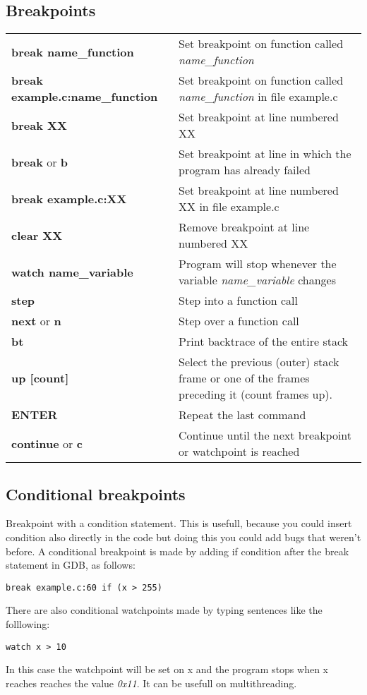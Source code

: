 \subsection{Breakpoints}
\begin{table}[h]
\footnotesize\centering
\begin{tabular}{|l|l|}
\hline
{\textbf{break name\_function}} & {Set breakpoint on function called \textit{name\_function}}\\
{\textbf{break example.c:name\_function}} & {Set breakpoint on function called \textit{name\_function} in file example.c}\\
\hline
{\textbf{break XX}} & {Set breakpoint at line numbered XX}\\
{\textbf{break} or \textbf{b}} & {Set breakpoint at line in which the program has already failed}\\
{\textbf{break example.c:XX}} & {Set breakpoint at line numbered XX in file example.c}\\
\hline
{\textbf{clear XX}} & {Remove breakpoint at line numbered XX}\\
\hline
{\textbf{watch name\_variable}} & {Program will stop whenever the variable \textit{name\_variable} changes}\\
\hline
{\textbf{step}} & {Step into a function call}\\
\hline
{\textbf{next} or \textbf{n}} & {Step over a function call}\\
\hline
{\textbf{bt}} & {Print backtrace of the entire stack}\\
\hline
{\textbf{up [count]}} & {Select the previous (outer) stack frame or one of the frames preceding it (count frames up).}\\
\hline
{\textbf{ENTER}} & {Repeat the last command}\\
\hline
{\textbf{continue} or \textbf{c}} & {Continue until the next breakpoint or watchpoint is reached}\\
\hline
\end{tabular}
\end{table}
\subsection{Conditional breakpoints}
Breakpoint with a condition statement. This is usefull, because you could insert condition also directly in the code but doing this you could add bugs that weren't before. A conditional breakpoint is made by adding if condition after the break statement in GDB, as follows:
\begin{lstlisting}[linewidth=170pt, basicstyle=\footnotesize\sffamily,]
break example.c:60 if (x > 255)
\end{lstlisting}
There are also conditional watchpoints made by typing sentences like the folllowing:
\begin{lstlisting}[linewidth=60pt, basicstyle=\footnotesize\sffamily,]
watch x > 10
\end{lstlisting}
In this case the watchpoint will be set on x and the program stops when x reaches reaches the value \textit{0x11}. It can be usefull on multithreading.

